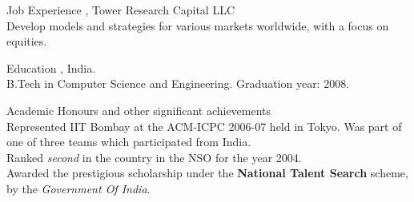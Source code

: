 \documentclass[final]{resume}
\author{Sangram R. Raje}
\def\designation{Senior Quantitative Analyst}
\def\tower{Tower Research Capital LLC}
\def\iitb{Indian Institute of Technology Bombay}
\begin{document}
\maketitle


\begin{category}{Job Experience}
\citem{\designation}, \tower\\
Develop models and strategies for various markets worldwide, with a focus on equities.
\end{category}
\vspace{1pt}


\begin{category}{Education}
\citem{\iitb}, India.\\
B.Tech in Computer Science and Engineering. Graduation year: 2008.
\end{category}
\vspace{1pt}


\begin{category}{Academic Honours and other significant achievements}
\\
Represented IIT Bombay at the ACM-ICPC 2006-07 held in Tokyo. Was part of one of three teams which participated from India.
\\
Ranked \emph{second} in the country in the NSO for the year 2004.
\\
Awarded the prestigious scholarship under the \textbf{National Talent Search} scheme, by the \emph{Government Of India}.
\end{category}
\vspace{1pt}

\end{document}
